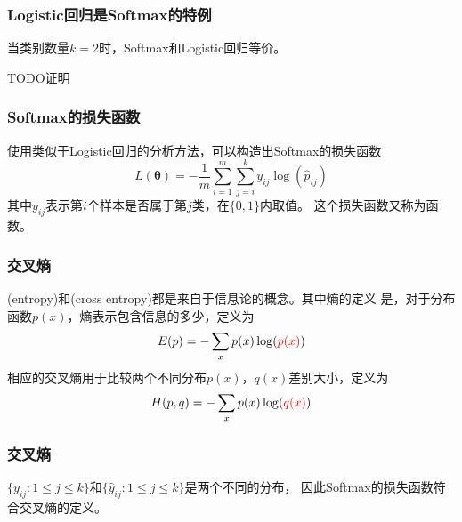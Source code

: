 \documentclass[14pt]{beamer}
\renewcommand{\vec}[1]{\bm{#1}}
\newcommand{\Vt}{\vec{\theta}}
\let\emph\relax %
\begin{document}
\begin{frame}
  \frametitle{Logistic回归是Softmax的特例}
  当类别数量$k=2$时，Softmax和Logistic回归等价。

  TODO证明
\end{frame}

\begin{frame}
  \frametitle{Softmax的损失函数}
  使用类似于Logistic回归的分析方法，可以构造出Softmax的损失函数
  \begin{equation}
    L(\Vt)=-\frac{1}{m}\sum_{i=1}^m\sum_{j=i}^k y_{ij}\log(\hat{p}_{ij})
  \end{equation}
  其中$y_{ij}$表示第$i$个样本是否属于第$j$类，在$\{0,1\}$内取值。
  这个损失函数又称为\emph{交叉熵}函数。
\end{frame}

\begin{frame}
  \frametitle{交叉熵}
  \emph{熵}(entropy)和\emph{交叉熵}(cross entropy)都是来自于信息论的概念。其中熵的定义
  是，对于分布函数$p(x)$，熵表示包含信息的多少，定义为
  \begin{equation}
    E(p)=-\sum_x p(x)\log({\color{red}p(x)})
  \end{equation}
  相应的交叉熵用于比较两个不同分布$p(x)$，$q(x)$差别大小，定义为
  \begin{equation}
    H(p,q)=-\sum_x p(x)\log({\color{red}q(x)})
  \end{equation}
\end{frame}

\begin{frame}
  \frametitle{交叉熵}
  $\{y_{ij}:1\leq j\leq k\}$和$\{\hat{y}_{ij}:1\leq j\leq k\}$是两个不同的分布，
  因此Softmax的损失函数符合交叉熵的定义。

  

\end{frame}
\end{document}
